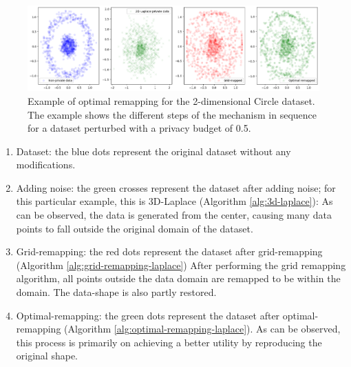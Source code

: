 \begin{figure}[H]
  \includegraphics[width=1.1\textwidth]{TheorethicalFramework//ND-Laplace//Images/output.png}
  \caption{Example of optimal remapping for the 2-dimensional Circle dataset. The example shows the different steps of the mechanism in sequence for a dataset perturbed with a privacy budget of 0.5.}
\end{figure}
\begin{enumerate}
  \item Dataset: the blue dots represent the original dataset without any modifications.
  \item Adding noise: the green crosses represent the dataset after adding noise; for this particular example, this is 3D-Laplace (Algorithm \ref{alg:3d-laplace}):
        As can be observed, the data is generated from the center, causing many data points to fall outside the original domain of the dataset.
  \item Grid-remapping: the red dots represent the dataset after grid-remapping (Algorithm \ref{alg:grid-remapping-laplace})
        After performing the grid remapping algorithm, all points outside the data domain are remapped to be within the domain. The data-shape is also partly restored. 
  \item Optimal-remapping: the green dots represent the dataset after optimal-remapping (Algorithm \ref{alg:optimal-remapping-laplace}). As can be observed, this process is primarily on achieving a better utility by reproducing the original shape.
\end{enumerate}

